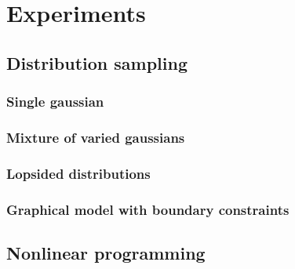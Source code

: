 \section{Experiments}
\subsection{Distribution sampling}
\subsubsection{Single gaussian}

\subsubsection{Mixture of varied gaussians}
\subsubsection{Lopsided distributions}
\subsubsection{Graphical model with boundary constraints}

\subsection{Nonlinear programming}
